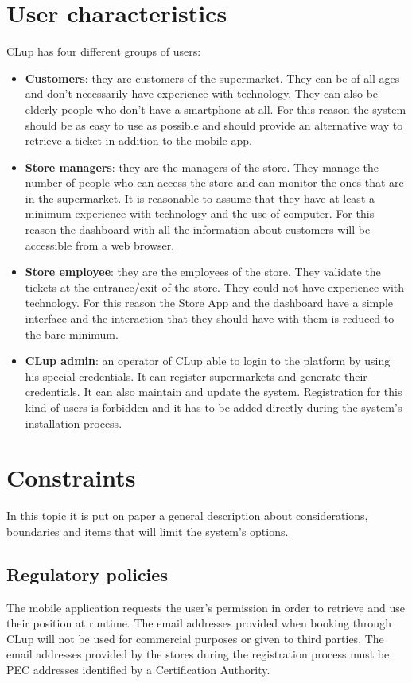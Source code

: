 \section{User characteristics}
CLup has four different groups of users:
\begin{itemize}
	\item \textbf{Customers}: they are customers of the supermarket. They can be of all ages and don't necessarily have experience with technology. They can also be elderly	people who don't have a smartphone at all. For this reason the system should be as easy to use as possible and should provide an alternative way to retrieve a ticket in addition to the mobile app.
	\item \textbf{Store managers}: they are the managers of the store. They manage the number of people who can access the store and can monitor the ones that are in the supermarket. It is reasonable to assume that they have at least a minimum experience with technology and the use of computer. For this reason the dashboard with all the information about customers will be accessible from a web browser.
	\item \textbf{Store employee}: they are the employees of the store. They validate the tickets at the entrance/exit of the store. They could not have experience with technology. For this reason the Store App and the dashboard have a simple interface and the interaction that they should have with them is reduced to the bare minimum.
    \item \textbf{CLup admin}: an operator of CLup able to login to the platform by using his special credentials. It can register supermarkets and generate their credentials. It can also maintain and update the system. Registration for this kind of users is forbidden and it has to be added directly during the system's installation process.
\end{itemize}

\section{Constraints}
In this topic it is put on paper a general description about considerations, boundaries and items that will limit the system's options.

\subsection{Regulatory policies}
The mobile application requests the user's permission in order to retrieve and use their position at runtime.\newline
The email addresses provided when booking through CLup will not be used for commercial purposes or given to third parties.\newline
The email addresses provided by the stores during the registration process must be PEC addresses identified by a Certification Authority.

